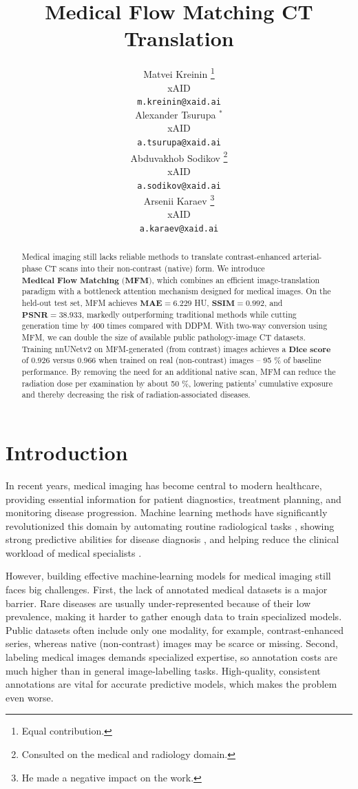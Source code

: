 \documentclass{article}
\title{Medical Flow Matching CT Translation}
\author{%
  Matvei Kreinin \thanks{Equal contribution.} \\
  xAID \\
  \texttt{m.kreinin@xaid.ai} \\
  \And
  Alexander Tsurupa $^*$ \\ %
  xAID \\
  \texttt{a.tsurupa@xaid.ai} \\
  \And 
  Abduvakhob Sodikov \thanks{Consulted on the medical and radiology domain.}\\
  xAID \\
  \texttt{a.sodikov@xaid.ai} \\
  \And 
  Arsenii Karaev \thanks{He made a negative impact on the work.}\\
  xAID \\
  \texttt{a.karaev@xaid.ai}
}
\begin{document}
\maketitle

\begin{abstract}
Medical imaging still lacks reliable methods to translate contrast-enhanced arterial-phase CT scans into their non-contrast (native) form. We introduce $\textbf{Medical Flow Matching (MFM)}$, which combines an efficient image-translation paradigm with a bottleneck attention mechanism designed for medical images. On the held-out test set, MFM achieves $\textbf{MAE}=6.229$ HU, $\textbf{SSIM}=0.992$, and $\textbf{PSNR}=38.933$, markedly outperforming traditional methods while cutting generation time by $400$ times compared with DDPM. With two-way conversion using MFM, we can double the size of available public pathology-image CT datasets. Training nnUNetv2 on MFM-generated (from contrast) images achieves a $\textbf{Dice score}$ of 0.926 versus 0.966 when trained on real (non-contrast) images -- 95 \% of baseline performance. By removing the need for an additional native scan, MFM can reduce the radiation dose per examination by about 50 \%, lowering patients’ cumulative exposure and thereby decreasing the risk of radiation-associated diseases.
\end{abstract}

\section{Introduction}
In recent years, medical imaging has become central to modern healthcare, providing essential information for patient diagnostics, treatment planning, and monitoring disease progression. Machine learning methods have significantly revolutionized this domain by automating routine radiological tasks \citep{mckinney2020international, ardila2019end}, showing strong predictive abilities for disease diagnosis \citep{esteva2017dermatologist, gulshan2016development}, and helping reduce the clinical workload of medical specialists \citep{topol2019high, dembrower2023artificial}.

However, building effective machine-learning models for medical imaging still faces big challenges. First, the lack of annotated medical datasets is a major barrier. Rare diseases are usually under-represented because of their low prevalence, making it harder to gather enough data to train specialized models. Public datasets often include only one modality, for example, contrast-enhanced series, whereas native (non-contrast) images may be scarce or missing. Second, labeling medical images demands specialized expertise, so annotation costs are much higher than in general image-labelling tasks. High-quality, consistent annotations are vital for accurate predictive models, which makes the problem even worse.
\end{document}
